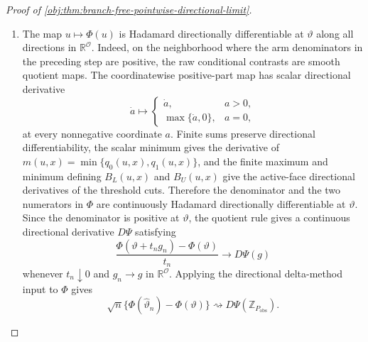 \begin{proof}[Proof of \cref{obj:thm:branch-free-pointwise-directional-limit}]
\begin{enumerate}
\item The map \(u\mapsto\Phi(u)\) is Hadamard directionally differentiable at \(\vartheta\) along all directions in \(\mathbb R^{\mathcal O}\). Indeed, on the neighborhood where the arm denominators in the preceding step are positive, the raw conditional contrasts are smooth quotient maps. The coordinatewise positive-part map has scalar directional derivative
\[
\dot a\mapsto
\begin{cases}
\dot a,&a>0,\\
\max\{\dot a,0\},&a=0,
\end{cases}
\]
at every nonnegative coordinate \(a\). Finite sums preserve directional differentiability, the scalar minimum gives the derivative of \(m(u,x)=\min\{q_0(u,x),q_1(u,x)\}\), and the finite maximum and minimum defining \(B_L(u,x)\) and \(B_U(u,x)\) give the active-face directional derivatives of the threshold cuts. Therefore the denominator and the two numerators in \(\Phi\) are continuously Hadamard directionally differentiable at \(\vartheta\). Since the denominator is positive at \(\vartheta\), the quotient rule gives a continuous directional derivative \(D\Psi\) satisfying
\[
\frac{\Phi(\vartheta+t_n g_n)-\Phi(\vartheta)}{t_n}
\longrightarrow
D\Psi(g)
\]
whenever \(t_n\downarrow0\) and \(g_n\to g\) in \(\mathbb R^{\mathcal O}\). Applying the directional delta-method input to \(\Phi\) gives
\[
\sqrt n\{\Phi(\widehat\vartheta_n)-\Phi(\vartheta)\}
\rightsquigarrow
D\Psi(\mathbb Z_{P_{\mathrm{obs}}}).
\]


\end{enumerate}
\end{proof}
